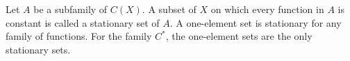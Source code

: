 Let $A$ be a subfamily of $C(X)$. A subset of $X$ on which every function in $A$ is constant is called a stationary set of $A$. A one-element set is stationary for any family of functions. For the family $C^*$, the one-element sets are the only stationary sets.
